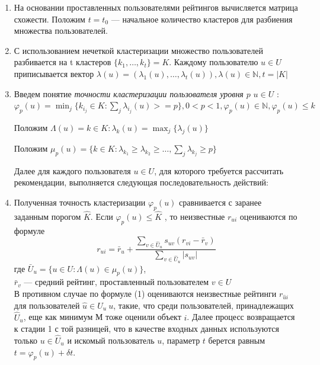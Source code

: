 \documentclass[a4paper, 12pt]{article} %
\begin{document}
\begin{enumerate} 


\item 
На основании проставленных пользователями рейтингов вычисляется матрица схожести. Положим $t = t_{0}$ --- начальное количество кластеров для разбиения множества пользователей.


\item 
С использованием нечеткой кластеризации множество пользователей разбивается на t кластеров $\{k_{1},\dots,k_{t}\}=K$.
Каждому пользователю $u \in U$ приписывается вектор $\lambda(u)=(\lambda_{1}(u),\dots,\lambda_{t}(u)), \lambda(u)\in\mathbb{N}, t=|K|$

\item
Введем понятие \textit{точности кластеризации пользователя уровня $p$} $u \in U$ :
$\varphi_{p}(u) = \min_{j} \{k_{i_{j}} \in K: \sum_{j} \lambda_{i_{j}}(u) >= p\}, 0 < p < 1, \varphi_{p}(u) \in \mathbb{N}, \varphi_{p}(u) \leq k$ 
\par
Положим $\Lambda(u) = k \in K: \lambda_{k}(u) = \max_{j} \{\lambda_{j}(u)\}$ 
\par
Положим $\mu_{p}(u) = \{k \in K: \lambda_{k_{1}} \geq\lambda_{k_{2}} \geq\dots, \sum_{j}\lambda_{k_{j}} \geq p\}$

Далее для каждого пользователя $u \in U$, для которого требуется рассчитать рекомендации, выполняется следующая последовательность действий: 

\item Полученная точность кластеризации $\varphi_{p}(u)$ сравнивается с заранее заданным порогом $\hat{K}$. Если $\varphi_{p}(u) \leq \hat{K}$ , то неизвестные $r_{ui}$ оцениваются по формуле 
\begin{equation}
	r_{ui} = \bar{r}_{u} + \frac{\sum_{v \in \hat{U}_{u}} s_{uv}(r_{vi} - \bar{r}_v)}{\sum_{v \in \hat{U}_{u}} |s_{uv}|}
\end{equation}
где $\bar{U}_{u} = \{u \in U:\Lambda(u) \in  \mu_{p}(u)\}$,\\ $\bar{r}_{v}$ --- средний рейтинг, проставленный пользователем $v \in U$\\
В противном случае по формуле (1) оцениваются неизвестные рейтинги $r_{\hat{u}i}$ для пользователей $\hat{u} \in \hat{U}_{u} \ u$, такие, что среди пользователей, принадлежащих $\hat{U}_{u}$, еще как минимум М тоже оценили объект $i$. Далее процесс возвращается к стадии 1 с той разницей, что в качестве входных данных используются только $u \in \hat{U}_{u}$ и искомый пользователь $u$, параметр $t$ берется равным $t = \varphi_{p}(u)  + \delta t$.

\end{enumerate}
\end{document}
